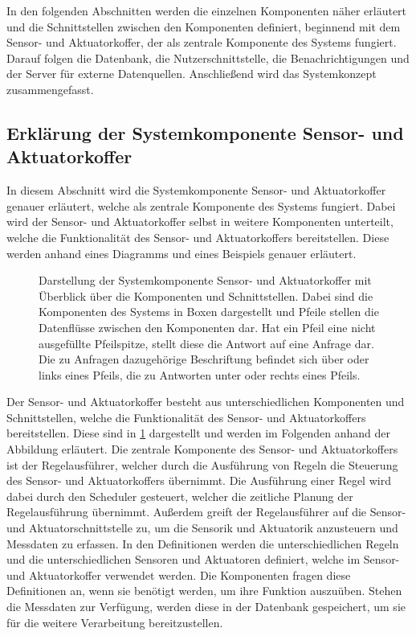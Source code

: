 In den folgenden Abschnitten werden die einzelnen Komponenten näher erläutert und die Schnittstellen zwischen den Komponenten definiert, beginnend mit dem Sensor- und Aktuatorkoffer, der als zentrale Komponente des Systems fungiert.
Darauf folgen die Datenbank, die Nutzerschnittstelle, die Benachrichtigungen und der Server für externe Datenquellen.
Anschließend wird das Systemkonzept zusammengefasst.


\subsection{Erklärung der Systemkomponente Sensor- und Aktuatorkoffer}
In diesem Abschnitt wird die Systemkomponente Sensor- und Aktuatorkoffer genauer erläutert, welche als zentrale Komponente des Systems fungiert.
Dabei wird der Sensor- und Aktuatorkoffer selbst in weitere Komponenten unterteilt, welche die Funktionalität des Sensor- und Aktuatorkoffers bereitstellen.
Diese werden anhand eines Diagramms und eines Beispiels genauer erläutert.

\begin{figure}[!htbp]
	\centering
	
	\caption[Darstellung der Systemkomponente Sensor- und Aktuatorkoffer.]{
		Darstellung der Systemkomponente Sensor- und Aktuatorkoffer mit Überblick über die Komponenten und Schnittstellen.
		Dabei sind die Komponenten des Systems in Boxen dargestellt und Pfeile stellen die Datenflüsse zwischen den Komponenten dar.
		Hat ein Pfeil eine nicht ausgefüllte Pfeilspitze, stellt diese die Antwort auf eine Anfrage dar.
		Die zu Anfragen dazugehörige Beschriftung befindet sich über oder links eines Pfeils, die zu Antworten unter oder rechts eines Pfeils.
		}
	\label{pic:koffer-konzept}
\end{figure}

Der Sensor- und Aktuatorkoffer besteht aus unterschiedlichen Komponenten und Schnittstellen, welche die Funktionalität des Sensor- und Aktuatorkoffers bereitstellen.
Diese sind in \cref{pic:koffer-konzept} dargestellt und werden im Folgenden anhand der Abbildung erläutert.
Die zentrale Komponente des Sensor- und Aktuatorkoffers ist der Regelausführer, welcher durch die Ausführung von Regeln die Steuerung des Sensor- und Aktuatorkoffers übernimmt.
Die Ausführung einer Regel wird dabei durch den Scheduler gesteuert, welcher die zeitliche Planung der Regelausführung übernimmt.
Außerdem greift der Regelausführer auf die Sensor- und Aktuatorschnittstelle zu, um die Sensorik und Aktuatorik anzusteuern und Messdaten zu erfassen.
In den Definitionen werden die unterschiedlichen Regeln und die unterschiedlichen Sensoren und Aktuatoren definiert, welche im Sensor- und Aktuatorkoffer verwendet werden.
Die Komponenten fragen diese Definitionen an, wenn sie benötigt werden, um ihre Funktion auszuüben.
Stehen die Messdaten zur Verfügung, werden diese in der Datenbank gespeichert, um sie für die weitere Verarbeitung bereitzustellen.


